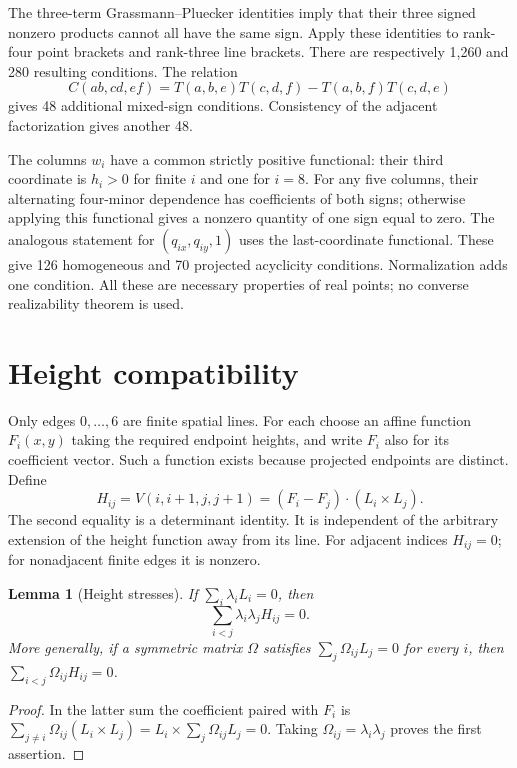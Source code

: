 \documentclass[11pt]{article}
\newtheorem{lemma}[theorem]{Lemma}
\begin{document}
The three-term Grassmann--Pluecker identities imply that their three
signed nonzero products cannot all have the same sign. Apply these
identities to rank-four point brackets and rank-three line brackets.
There are respectively 1,260 and 280 resulting conditions. The relation
\begin{equation}\label{eq:bracket}
 C(ab,cd,ef)=T(a,b,e)T(c,d,f)-T(a,b,f)T(c,d,e)
\end{equation}
gives 48 additional mixed-sign conditions. Consistency of the adjacent
factorization gives another 48.

The columns $w_i$ have a common strictly positive functional: their
third coordinate is $h_i>0$ for finite $i$ and one for $i=8$.
For any five columns, their alternating four-minor dependence has
coefficients of both signs; otherwise applying this functional gives
a nonzero quantity of one sign equal to zero. The analogous statement
for $(q_{ix},q_{iy},1)$ uses the last-coordinate functional. These give
126 homogeneous and 70 projected acyclicity conditions. Normalization
adds one condition. All these are necessary properties of real points;
no converse realizability theorem is used.

\section{Height compatibility}
Only edges $0,\ldots,6$ are finite spatial lines. For each choose an
affine function $F_i(x,y)$ taking the required endpoint heights, and
write $F_i$ also for its coefficient vector. Such a function exists
because projected endpoints are distinct. Define
\[
 H_{ij}=V(i,i+1,j,j+1)
       =(F_i-F_j)\cdot(L_i\times L_j).
\]
The second equality is a determinant identity. It is independent of the
arbitrary extension of the height function away from its line.
For adjacent indices $H_{ij}=0$; for nonadjacent finite edges it is nonzero.

\begin{lemma}[Height stresses]\label{lem:stress}
If $\sum_i\lambda_iL_i=0$, then
\begin{equation}\label{eq:stress}
 \sum_{i<j}\lambda_i\lambda_jH_{ij}=0.
\end{equation}
More generally, if a symmetric matrix $\Omega$ satisfies
$\sum_j\Omega_{ij}L_j=0$ for every $i$, then
$\sum_{i<j}\Omega_{ij}H_{ij}=0$.
\end{lemma}
\begin{proof}
In the latter sum the coefficient paired with $F_i$ is
$\sum_{j\ne i}\Omega_{ij}(L_i\times L_j)
=L_i\times\sum_j\Omega_{ij}L_j=0$.
Taking $\Omega_{ij}=\lambda_i\lambda_j$ proves the first assertion.
\end{proof}
\end{document}

